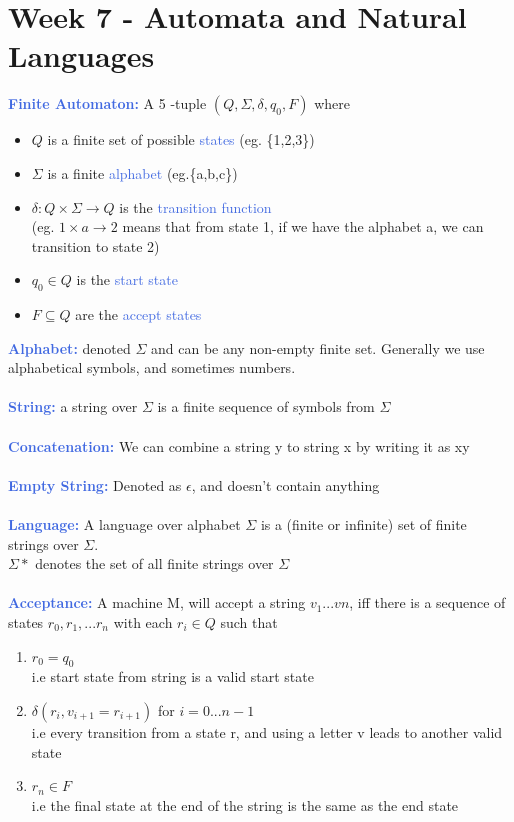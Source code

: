 \documentclass[a4paper,10pt]{article}
\begin{document}
\section*{Week 7 - Automata and Natural Languages}
\textcolor{RoyalBlue}{\textbf{Finite Automaton:}} A 5 -tuple $(Q, \Sigma, \delta, q_{0}, F)$ where 
\renewcommand{\labelitemi}{\textperiodcentered}
\begin{itemize}
\item $Q$ is a finite set of possible \textcolor{RoyalBlue}{states} (eg. \{1,2,3\})
\item $\Sigma$ is a finite \textcolor{RoyalBlue}{alphabet} (eg.\{a,b,c\})
\item $\delta: Q \times \Sigma \rightarrow Q$ is the \textcolor{RoyalBlue}{transition function} \\
(eg. $1 \times a \rightarrow 2$ means that from state 1, if we have the alphabet a, we can transition to state 2)
\item $q_{0} \in Q$ is the \textcolor{RoyalBlue}{start state}
\item $F \subseteq Q$ are the \textcolor{RoyalBlue}{accept states}
\end{itemize}
\textcolor{RoyalBlue}{\textbf{Alphabet:}} denoted $\Sigma$ and can be any non-empty finite set. Generally we use alphabetical symbols, and sometimes numbers. \\\\
\textcolor{RoyalBlue}{\textbf{String:}} a string over $\Sigma$ is a finite sequence of symbols from $\Sigma$ \\\\
\textcolor{RoyalBlue}{\textbf{Concatenation:}} We can combine a string y to string x by writing it as xy \\\\
\textcolor{RoyalBlue}{\textbf{Empty String:}} Denoted as $\epsilon$, and doesn't contain anything \\\\
\textcolor{RoyalBlue}{\textbf{Language:}} A language over alphabet $\Sigma$ is a (finite or infinite) set of finite strings over $\Sigma$. \\
$\Sigma*$ denotes the set of all finite strings over $\Sigma$\\\\
\textcolor{RoyalBlue}{\textbf{Acceptance:}} A machine M, will accept a string $v_{1}...v{n}$, iff there is a sequence of states $r_{0}, r_{1},...r_{n}$ with each $r_{i} \in Q$ such that 
\begin{enumerate}
\item $r_{0} = q_{0}$ \\
i.e start state from string is a valid start state
\item $\delta(r_{i}, v_{i+1} = r_{i+1})$ for $i=0...n-1$\\
i.e every transition from a state r, and using a letter v leads to another valid state
\item $r_{n} \in F$\\
i.e the final state at the end of the string is the same as the end state
\end{enumerate}
\end{document}

